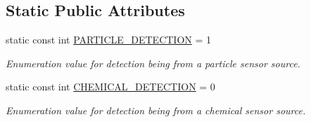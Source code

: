 \subsection*{Static Public Attributes}
\begin{DoxyCompactItemize}
\item 
\hypertarget{class_cloud_detection_ae1384e255610bb8910a57a8cbb602f7c}{
static const int \hyperlink{class_cloud_detection_ae1384e255610bb8910a57a8cbb602f7c}{PARTICLE\_\-DETECTION} = 1}
\label{class_cloud_detection_ae1384e255610bb8910a57a8cbb602f7c}

\begin{DoxyCompactList}\small\item\em Enumeration value for detection being from a particle sensor source. \end{DoxyCompactList}\item 
\hypertarget{class_cloud_detection_aa5d2007719dc9d18b404d0275f7a1fdf}{
static const int \hyperlink{class_cloud_detection_aa5d2007719dc9d18b404d0275f7a1fdf}{CHEMICAL\_\-DETECTION} = 0}
\label{class_cloud_detection_aa5d2007719dc9d18b404d0275f7a1fdf}

\begin{DoxyCompactList}\small\item\em Enumeration value for detection being from a chemical sensor source. \end{DoxyCompactList}\end{DoxyCompactItemize}
